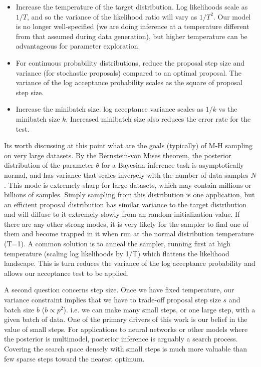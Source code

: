 \documentclass{article}
\begin{document}
\begin{itemize}
  
\item Increase the temperature of the target distribution. Log likelihoods
  scale as $1/T$, and so the variance of the likelihood ratio will
  vary as $1/T^2$. Our model is no longer well-specified (we are doing inference
  at a temperature different from that assumed during data generation), but
  higher temperature can be advantageous for parameter exploration.

\item For continuous probability distributions, reduce the proposal
  step size and variance (for stochastic proposals) compared to an optimal
  proposal. The variance of the log acceptance probability scales as the
  square of proposal step size. 

\item Increase the minibatch size. log acceptance variance scales as $1/k$ vs the
  minibatch size $k$. Increased minibatch size also reduces the error rate for
  the test. 

\end{itemize}

Its worth discussing at this point what are the goals (typically) of
M-H sampling on very large datasets.  By the Bernstein-von Mises
theorem, the posterior distribution of the parameter $\theta$ for a
Bayesian inference task is asymptotically normal, and has variance
that scales inversely with the number of data samples $N$. This mode
is extremely sharp for large datasets, which may contain millions or
billions of samples. Simply sampling from this distribution is one
application, but an efficient proposal distribution
\cite{OptimalScaling01} has similar variance to the target
distribution and will diffuse to it extremely slowly from an random
initialization value. If there are any other strong modes, it is very
likely for the sampler to find one of them and become trapped in it
when run at the normal distribution temperature (T=1). A common
solution is to anneal the sampler, running first at high temperature
(scaling log likelihoods by 1/T) which flattens the likelihood
landscape.  This is turn reduces the variance of the log acceptance
probability and allows our acceptance test to be applied.

A second question concerns step size. Once we have fixed temperature,
our variance constraint implies that we have to trade-off proposal
step size $s$ and batch size $b$ ($b \propto p^2$). i.e. we can make
many small steps, or one large step, with a given batch of data. One
of the primary drivers of this work is our belief in the value of
small steps. For applications to neural networks or other models where
the posterior is multimodel, posterior inference is arguably a search
process. Covering the search space densely with small steps is much
more valuable than few sparse steps toward the nearest optimum.
\end{document}
